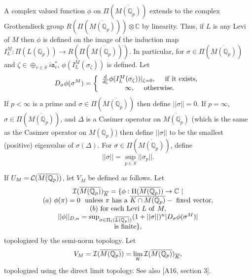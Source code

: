 A complex valued function $\phi$ on
$\Pi(\overline{M({\mathbb{Q}}_p)})$ extends to the
complex Grothendieck group
$R(\Pi(\overline{M({\mathbb{Q}}_p)}))\otimes {\mathbb{C}}$ by linearity.
Thus, if $L$ is any Levi of $M$ then $\phi$ is defined on the image of
the induction map
$I_L^M: \Pi(L({\mathbb{Q}}_p))\rightarrow R(\Pi(\overline{M({\mathbb{Q}}_p)}))$.
In particular, for $\sigma\in \Pi(\overline{M({\mathbb{Q}}_p)})$ and
$\zeta\in \oplus_{v\in S}i{\mathfrak{a}}^*_v$, $\phi(I_L^M(\sigma_\zeta))$ is
defined. Let
\begin{equation}
D_\sigma \phi(\sigma^M)=
\left\{
\begin{array}{c}
{d\over d\zeta}\phi(I_L^M(\sigma_\zeta))|_{\zeta =0},
\ \ \ \ {\rm if\ it\ exists},\\
\infty,\ \ \ \ {\rm otherwise}.
\end{array}
\right.
\end{equation}
If $p<\infty$ is a prime and
$\sigma\in \Pi(\overline{M({\mathbb{Q}}_p)})$ then define
$||\sigma||=0$. If $p=\infty$,
$\sigma\in \Pi(\overline{M({\mathbb{Q}}_p)})$,
and $\Delta$
is a Casimer operator on $\overline{M({\mathbb{Q}}_p)}$
(which is the same as the Casimer operator on
$M({\mathbb{Q}}_p)$)
then define $||\sigma||$ to be the
smallest (positive) eigenvalue of $\sigma(\Delta)$. For
$\sigma\in \Pi(\overline{M({\mathbb{Q}}_p)})$, define
\[
||\sigma||=\sup_{p\in S}||\sigma_p||.
\]

If $U_M={\cal{C}}(\overline{M({\mathbb{Q}}_p)})$, let
$V_M$ be defined as follows.
Let
\[
\begin{array}{c}
{\cal{I}}(\overline{M({\mathbb{Q}}_p)})_{\overline{K}}
=\{\phi: \Pi(\overline{M({\mathbb{Q}}_p)})\rightarrow {\mathbb{C}} \ | \\
(a) \ \phi(\pi)=0\ {\rm \ unless\ }\pi{\rm \ has\ a\ }
\overline{K\cap M({\mathbb{Q}}_p)}-{\rm \ fixed\ vector},\\
(b)\ {\rm for \ each\ Levi\ }L{\rm\ of\ }M,\\
||\phi||_{D,n}=\sup_{\sigma\in \Pi_t(\overline{L({\mathbb{Q}}_p)})}
(1+||\sigma||)^n|D_\sigma \phi(\sigma^M)|\\
{\rm is\ finite}\},
\end{array}
\]
topologized by the semi-norm topology. Let
\begin{equation}
V_M=
{\cal{I}}(\overline{M({\mathbb{Q}}_p)})
=\lim_{K}{\cal{I}}(\overline{M({\mathbb{Q}}_p)})_{\overline{K}},
\end{equation}
topologized using the direct limit topology.
See also [A16, section 3].

